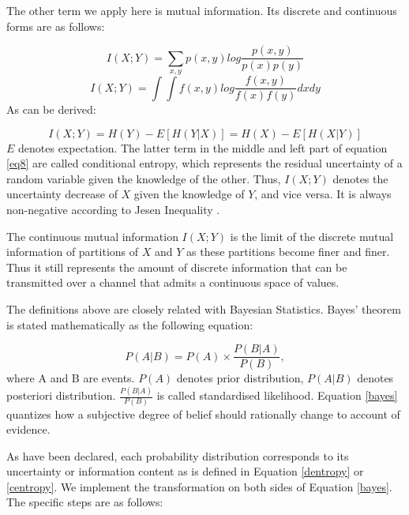 \documentclass[draft,wrr]{AGUTeX}
\begin{document}
\begin{article}
The other term we apply here is mutual information. Its discrete and continuous forms are as follows:

\begin{equation}
I(X;Y)=\sum_{x,y}p(x,y)log\frac{p(x,y)}{p(x)p(y)}
\end{equation}
\begin{equation}
I(X;Y)=\int \int f(x,y)log\frac{f(x,y)}{f(x)f(y)}dxdy
\end{equation}
As can be derived:

\begin{equation}\label{eq8}
I(X;Y)=H(Y)-E[H(Y|X)]=H(X)-E[H(X|Y)]
\end{equation}
$E$ denotes expectation. The latter term in the middle and left part of equation \eqref{eq8} 
are called conditional entropy, which represents the residual uncertainty of a random variable given the knowledge of the other. Thus,
$I(X;Y)$ denotes %
the uncertainty decrease of $X$ given the knowledge of $Y$, and vice versa. It is always non-negative according to  Jesen Inequality \citep{cover2012elements}.

The continuous mutual information $I(X;Y)$ is the limit of the discrete mutual information of partitions of $X$ and $Y$ as these partitions become finer and finer. Thus it  still represents the amount of discrete information that can be transmitted over a channel that admits a continuous space of values.

The definitions above are closely related with Bayesian Statistics. Bayes' theorem is stated mathematically as the following equation:

\begin{equation}
\label{bayes}
P(A|B) = P(A)\times \frac{P(B | A)}{P(B)},
\end{equation}
where A and B are events.
$P(A)$ denotes prior distribution, $P(A|B)$ denotes posteriori distribution. $\frac{P(B | A)}{P(B)}$ is called standardised likelihood. 
Equation \eqref{bayes} quantizes how a subjective degree of belief should rationally change to account of evidence. 

As have been declared, each probability distribution corresponds to its uncertainty or information content as is defined in Equation \eqref{dentropy}  or  \eqref{centropy}. We implement the transformation on both sides of Equation \eqref{bayes}. The specific steps are as follows:


\end{article}
\end{document}
